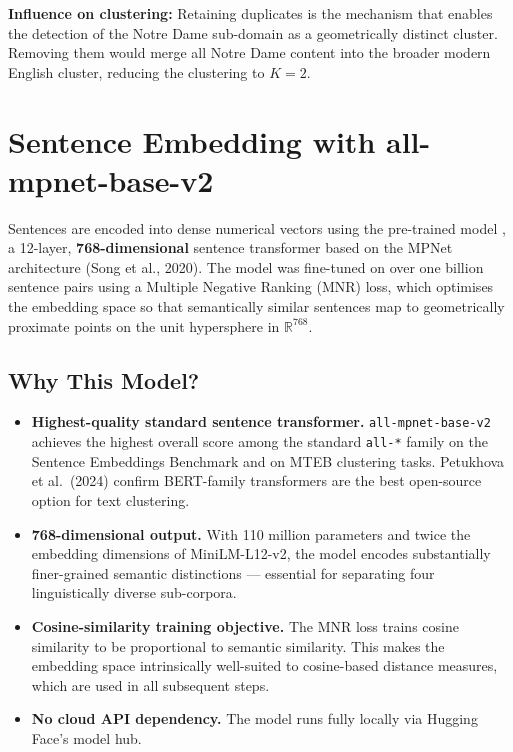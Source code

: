 \documentclass[11pt, a4paper]{article}
\begin{document}
\begin{insightbox}
\textbf{Influence on clustering:} Retaining duplicates is the mechanism that
enables the detection of the Notre Dame sub-domain as a geometrically
distinct cluster.  Removing them would merge all Notre Dame content into the
broader modern English cluster, reducing the clustering to $K=2$.
\end{insightbox}

\section{Sentence Embedding with all-mpnet-base-v2}

Sentences are encoded into dense numerical vectors using the pre-trained model
\textbf{}, a 12-layer,
\textbf{768-dimensional} sentence transformer based on the MPNet architecture
(Song et al., 2020).  The model was fine-tuned on over one billion sentence
pairs using a Multiple Negative Ranking (MNR) loss, which optimises the
embedding space so that semantically similar sentences map to geometrically
proximate points on the unit hypersphere in $\mathbb{R}^{768}$.

\subsection{Why This Model?}

\begin{itemize}
  \item \textbf{Highest-quality standard sentence transformer.}
        \texttt{all-mpnet-base-v2} achieves the highest overall score among
        the standard \texttt{all-*} family on the Sentence Embeddings
        Benchmark and on MTEB clustering tasks.  Petukhova et al.\ (2024)
        confirm BERT-family transformers are the best open-source option for
        text clustering.

  \item \textbf{768-dimensional output.}  With 110 million parameters and
        twice the embedding dimensions of MiniLM-L12-v2, the model encodes
        substantially finer-grained semantic distinctions --- essential for
        separating four linguistically diverse sub-corpora.

  \item \textbf{Cosine-similarity training objective.}  The MNR loss trains
        cosine similarity to be proportional to semantic similarity.  This
        makes the embedding space intrinsically well-suited to cosine-based
        distance measures, which are used in all subsequent steps.

  \item \textbf{No cloud API dependency.}  The model runs fully locally via
        Hugging Face's model hub.
\end{itemize}
\end{document}
